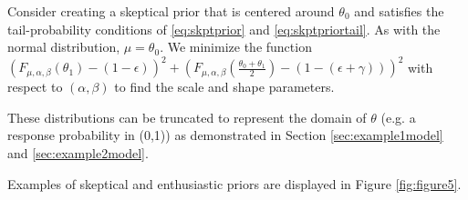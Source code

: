 \documentclass[12pt]{article}
\begin{document}
Consider creating a skeptical prior that is centered around $\theta_0$ and satisfies the tail-probability conditions of \eqref{eq:skptprior} and \eqref{eq:skptpriortail}. As with the normal distribution, $\mu=\theta_0$. We minimize the function $(F_{\mu,\alpha,\beta}(\theta_1)-(1-\epsilon))^2+(F_{\mu,\alpha,\beta}(\frac{\theta_0+\theta_1}{2})-(1-(\epsilon+\gamma)))^2$ with respect to $(\alpha,\beta)$ to find the scale and shape parameters.

These distributions can be truncated to represent the domain of $\theta$ (e.g. a response probability in (0,1)) as demonstrated in Section \ref{sec:example1model} and \ref{sec:example2model}.

Examples of skeptical and enthusiastic priors are displayed in Figure \ref{fig:figure5}.
%
%

%
\end{document}
